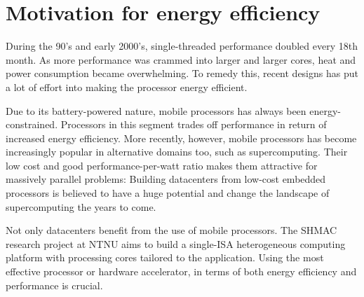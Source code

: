 \section{Motivation for energy efficiency}

During the 90's and early 2000's, single-threaded performance doubled every 18th
month. As more performance was crammed into larger and larger cores, heat and
power consumption became overwhelming. To remedy this, recent designs has put a
lot of effort into making the processor energy efficient.

Due to its battery-powered nature, mobile processors has always been
energy-constrained. Processors in this segment trades off performance in return
of increased energy efficiency. More recently, however, mobile processors has
become increasingly popular in alternative domains too, such as supercomputing.
Their low cost and good performance-per-watt ratio makes them attractive for
massively parallel problems: Building datacenters from low-cost embedded
processors is believed to have a huge potential and change the landscape of
supercomputing the years to come.

Not only datacenters benefit from the use of mobile processors. The SHMAC
research project at NTNU aims to build a single-ISA heterogeneous computing
platform with processing cores tailored to the application. Using the most
effective processor or hardware accelerator, in terms of both energy efficiency
and performance is crucial.


